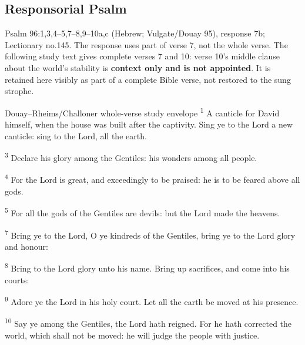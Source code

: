 \subsection{Responsorial Psalm}
\label{proper-psalm}
Psalm 96:1,3,4--5,7--8,9--10a,c (Hebrew; Vulgate/Douay 95), response 7b; Lectionary no.145. The response uses part of verse 7, not the whole verse. The following study text gives complete verses 7 and 10: verse 10's middle clause about the world's stability is \textbf{context only and is not appointed}. It is retained here visibly as part of a complete Bible verse, not restored to the sung strophe.
\begin{englishwitness}{Douay--Rheims/Challoner whole-verse study envelope}
\textsuperscript{1} A canticle for David himself, when the house was built after the captivity. Sing ye to the Lord a new canticle: sing to the Lord, all the earth.

\textsuperscript{3} Declare his glory among the Gentiles: his wonders among all people.

\textsuperscript{4} For the Lord is great, and exceedingly to be praised: he is to be feared above all gods.

\textsuperscript{5} For all the gods of the Gentiles are devils: but the Lord made the heavens.

\textsuperscript{7} Bring ye to the Lord, O ye kindreds of the Gentiles, bring ye to the Lord glory and honour:

\textsuperscript{8} Bring to the Lord glory unto his name. Bring up sacrifices, and come into his courts:

\textsuperscript{9} Adore ye the Lord in his holy court. Let all the earth be moved at his presence.

\textsuperscript{10} Say ye among the Gentiles, the Lord hath reigned. For he hath corrected the world, which shall not be moved: he will judge the people with justice.
\end{englishwitness}

